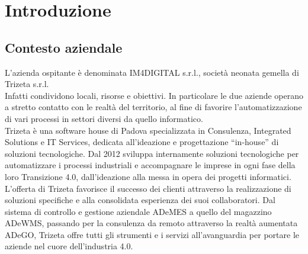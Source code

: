
\chapter{Introduzione}
\label{cap:introduzione}





\section{Contesto aziendale}

L'azienda ospitante è denominata IM4DIGITAL s.r.l., società neonata gemella di Trizeta s.r.l.\\
Infatti condividono locali, risorse e obiettivi. In particolare le due aziende operano a stretto contatto con le realtà del territorio,
al fine di favorire l'automatizzazione di vari processi in settori diversi da quello informatico.\\
Trizeta è una software house di Padova specializzata in Consulenza, Integrated Solutions e IT Services, dedicata all’ideazione e progettazione “in-house” di soluzioni tecnologiche. Dal 2012 sviluppa internamente soluzioni tecnologiche per automatizzare i processi industriali e accompagnare le imprese in ogni fase della loro Transizione 4.0, dall’ideazione alla messa in opera dei progetti informatici.
L’offerta di Trizeta favorisce il successo dei clienti attraverso la realizzazione di soluzioni specifiche e alla consolidata esperienza dei suoi collaboratori.
Dal sistema di controllo e gestione aziendale ADeMES a quello del magazzino ADeWMS, passando per la consulenza da remoto attraverso la realtà aumentata ADeGO, Trizeta offre tutti gli strumenti e i servizi all’avanguardia per portare le aziende nel cuore dell’industria 4.0.

